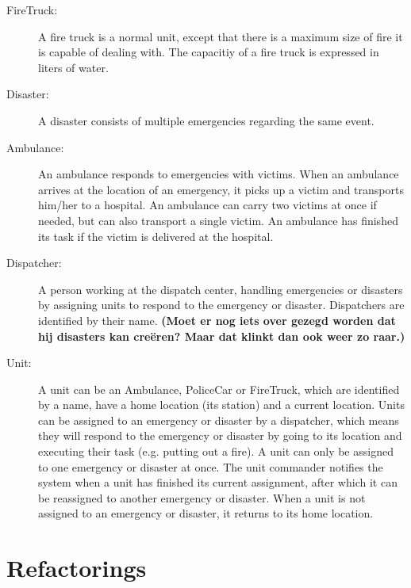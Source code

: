 \documentclass[a4paper]{article}
\begin{document}
\begin{empfile}
\begin{description}
  \item[FireTruck:] A fire truck is a normal unit, except that there is a maximum size of fire it is capable of dealing with. The capacitiy of a fire truck is expressed in liters of water.
  \item[Disaster:] A disaster consists of multiple emergencies regarding the same event.
  \item[Ambulance:] An ambulance responds to emergencies with victims. When an ambulance arrives at the location of an emergency, it picks up a victim and transports him/her to a hospital. An ambulance can carry two victims at once if needed, but can also transport a single victim. An ambulance has finished its task if the victim is delivered at the hospital. 
  \item[Dispatcher:] A person working at the dispatch center, handling emergencies or disasters by assigning units to respond to the emergency or disaster. Dispatchers are identified by their name. \textbf{(Moet er nog iets over gezegd worden dat hij disasters kan cre\"eren? Maar dat klinkt dan ook weer zo raar.)}
  \item[Unit:] A unit can be an Ambulance, PoliceCar or FireTruck, which are identified by a name, have a home location (its station) and a current location. Units can be assigned to an emergency or disaster by a dispatcher, which means they will respond to the emergency or disaster by going to its location and executing their task (e.g. putting out a fire). A unit can only be assigned to one emergency or disaster at once. The unit commander notifies the system when a unit has finished its current assignment, after which it can be reassigned to another emergency or disaster. When a unit is not assigned to an emergency or disaster, it returns to its home location.
\end{description}
\section{Refactorings}
\end{empfile}
\end{document}
